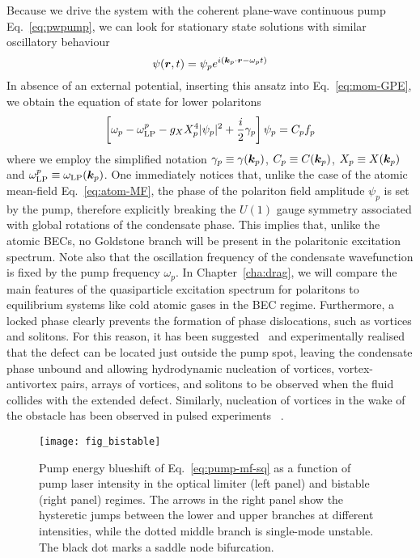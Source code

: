 Because we drive the system with the coherent plane-wave continuous
pump Eq.~\eqref{eq:pwpump}, we can look for stationary state solutions
with similar oscillatory behaviour
%
\begin{equation}\label{eq:pump-ansatz}
  \psi(\bm{r},t) = \psi_p e^{i (\bm{k}_p \cdot \bm{r}- \omega_p t)}
\end{equation}
% 
In absence of an external potential, inserting this ansatz into
Eq.~\eqref{eq:mom-GPE}, we obtain the equation of state for lower
polaritons
%
\begin{equation}\label{eq:pump-mf}
  \left[ \omega_p - \omega^p_{\text{LP}} - g_X X_p^4 \vert \psi_p \vert^2 + \frac{i}{2}\gamma_p\right]\psi_p = C_p f_p
\end{equation}
% 
where we employ the simplified notation
$\gamma_p \equiv \gamma(\bm{k}_p)$, $C_p \equiv C(\bm{k}_p)$,
$X_p \equiv X(\bm{k}_p)$ and
$\omega^p_{\text{LP}} \equiv \omega_{\text{LP}}(\bm{k}_p)$. One
immediately notices that, unlike the case of the atomic mean-field
Eq.~\eqref{eq:atom-MF}, the phase of the polariton field amplitude
$\psi_p$ is set by the pump, therefore explicitly breaking the $U(1)$
gauge symmetry associated with global rotations of the condensate
phase. This implies that, unlike the atomic BECs, no Goldstone branch
will be present in the polaritonic excitation spectrum. Note also that
the oscillation frequency of the condensate wavefunction is fixed by
the pump frequency $\omega_p$. In Chapter~\ref{cha:drag}, we will
compare the main features of the quasiparticle excitation spectrum for
polaritons to equilibrium systems like cold atomic gases in the BEC
regime. Furthermore, a locked phase clearly prevents the formation of
phase dislocations, such as vortices and solitons. For this reason, it
has been suggested~\cite{Pigeon_2011} and experimentally
realised~\cite{Amo_2011} that the defect can be located just outside
the pump spot, leaving the condensate phase unbound and allowing
hydrodynamic nucleation of vortices, vortex-antivortex pairs, arrays
of vortices, and solitons to be observed when the fluid collides with
the extended defect. Similarly, nucleation of vortices in the wake of
the obstacle has been observed in pulsed experiments
~\cite{Nardin_2011,Sanvitto_2011}.


%
\begin{figure}[tb]\centering
  \texttt{[image: fig\_bistable]}
  \caption{
    Pump energy blueshift of Eq.~\eqref{eq:pump-mf-sq} as a function
    of pump laser intensity in the optical limiter (left panel) and
    bistable (right panel) regimes. The arrows in the right panel show the
    hysteretic jumps between the lower and upper branches at different
    intensities, while the dotted middle branch is single-mode
    unstable. The black dot marks a saddle node bifurcation.
  }\label{fig:bistable}
\end{figure}
%

